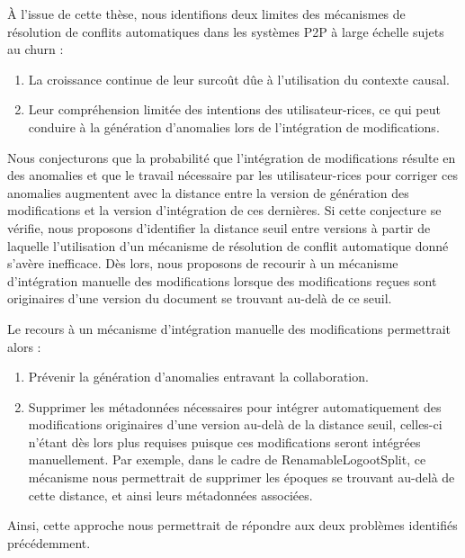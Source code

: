 \label{sec:manual-merge}

À l'issue de cette thèse, nous identifions deux limites des mécanismes de résolution de conflits automatiques dans les systèmes \ac{P2P} à large échelle sujets au churn :
\begin{enumerate}
    \item La croissance continue de leur surcoût dûe à l'utilisation du contexte causal.
    \item Leur compréhension limitée des intentions des utilisateur-rices, ce qui peut conduire à la génération d'anomalies lors de l'intégration de modifications.
\end{enumerate}

Nous conjecturons que la probabilité que l'intégration de modifications résulte en des anomalies et que le travail nécessaire par les utilisateur-rices pour corriger ces anomalies augmentent avec la distance entre la version de génération des modifications et la version d'intégration de ces dernières.
Si cette conjecture se vérifie, nous proposons d'identifier la distance seuil entre versions à partir de laquelle l'utilisation d'un mécanisme de résolution de conflit automatique donné s'avère inefficace.
Dès lors, nous proposons de recourir à un mécanisme d'intégration manuelle des modifications lorsque des modifications reçues sont originaires d'une version du document se trouvant au-delà de ce seuil.

Le recours à un mécanisme d'intégration manuelle des modifications permettrait alors :
\begin{enumerate}
    \item Prévenir la génération d'anomalies entravant la collaboration.
    \item Supprimer les métadonnées nécessaires pour intégrer automatiquement des modifications originaires d'une version au-delà de la distance seuil, celles-ci n'étant dès lors plus requises puisque ces modifications seront intégrées manuellement.
        Par exemple, dans le cadre de RenamableLogootSplit, ce mécanisme nous permettrait de supprimer les époques se trouvant au-delà de cette distance, et ainsi leurs métadonnées associées.
\end{enumerate}
Ainsi, cette approche nous permettrait de répondre aux deux problèmes identifiés précédemment.\\

